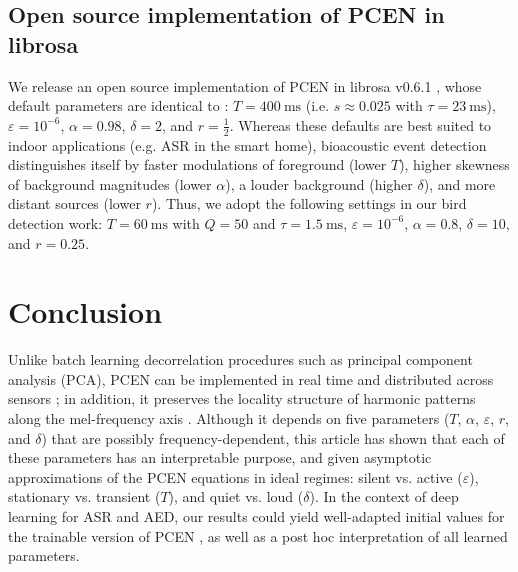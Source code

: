 \documentclass[journal]{IEEEtran}
\makeatletter
\newcommand*{\eg}{e.g.\@\xspace}
\newcommand*{\ie}{i.e.\@\xspace}
\newcommand*{\vs}{vs.\@\xspace}
\theoremstyle{remark}
\makeatother
\begin{document}
\subsection{Open source implementation of PCEN in librosa}
We release an open source implementation of PCEN in librosa v0.6.1 \cite{mcfee2018librosa061}, whose default parameters are identical to \cite{wang2017icassp}:  $T=\SI{400}{\milli\second}$ (\ie{} $s\approx0.025$ with $\tau = \SI{23}{\milli\second}$), $\varepsilon=10^{-6}$, $\alpha=0.98$, $\delta=2$, and $r=\frac{1}{2}$.
Whereas these defaults are best suited to indoor applications (\eg{} ASR in the smart home), bioacoustic event detection distinguishes itself by faster modulations of foreground (lower $T$), higher skewness of background magnitudes (lower $\alpha$), a louder background (higher $\delta$), and more distant sources (lower $r$).
Thus, we adopt the following settings in our bird detection work: $T=\SI{60}{\milli\second}$ with $Q=50$ and $\tau=\SI{1.5}{\milli\second}$, $\varepsilon=10^{-6}$, $\alpha=0.8$, $\delta=10$, and $r=0.25$.

\section{Conclusion}

Unlike batch learning decorrelation procedures such as principal component analysis (PCA), PCEN can be implemented in real time and distributed across sensors \cite{bello2018cacm}; in addition, it preserves the locality structure of harmonic patterns along the mel-frequency axis \cite{lostanlen2016ismir}.
Although it depends on five parameters ($T$, $\alpha$, $\varepsilon$, $r$, and $\delta$) that are possibly frequency-dependent, this article has shown that each of these parameters has an interpretable purpose, and given asymptotic approximations of the PCEN equations in ideal regimes: silent \vs{} active ($\varepsilon$), stationary \vs{} transient ($T$), and quiet \vs{} loud ($\delta$).
In the context of deep learning for ASR and AED, our results could yield well-adapted initial values for the trainable version of PCEN \cite{wang2017icassp}, as well as a post hoc interpretation of all learned parameters.
\end{document}
